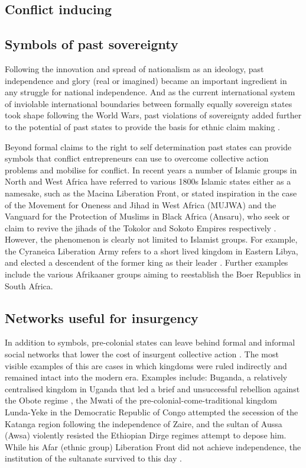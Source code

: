 \documentclass[12pt]{article}
\begin{document}
\subsection{Conflict inducing}

\subsection{Symbols of past sovereignty}

Following the innovation and spread of nationalism as an ideology, past
independence and glory (real or imagined) became an important ingredient in any
struggle for national independence. And as the current international system of
inviolable international boundaries between formally equally sovereign states
took shape following the World Wars, past violations of sovereignty added
further to the potential of past states to provide the basis for ethnic claim
making \citep{Ahram2019, Shelef2016}. 

Beyond formal claims to the right to self determination past states can provide
symbols that conflict entrepreneurs can use to overcome collective action
problems and mobilise for conflict. In recent years a number of Islamic groups
in North and West Africa have referred to various 1800s Islamic states either as
a namesake, such as the Macina Liberation Front, or stated inspiration in the
case of the Movement for Oneness and Jihad in West Africa (MUJWA) and the
Vanguard for the Protection of Muslims in Black Africa (Ansaru), who seek or
claim to revive the jihads of the Tokolor and Sokoto Empires respectively
\citep{Zenn2015}. However, the phenomenon is clearly not limited to Islamist
groups. For example, the Cyraneica Liberation Army refers to a short lived
kingdom in Eastern Libya, and elected a descendent of the former king as their
leader \citep{Ahram2019}. Further examples include the various Afrikaaner groups
aiming to reestablish the Boer Republics in South Africa.

\subsection{Networks useful for insurgency}

In addition to symbols, pre-colonial states can leave behind formal and informal
social networks that lower the cost of insurgent collective action
\citep{Wig2016, Wood2000}. The most visible examples of this are cases in which
kingdoms were ruled indirectly and remained intact into the modern era. Examples
include: Buganda, a relatively centralised kingdom in Uganda that led a brief
and unsuccessful rebellion against the Obote regime \citep{Tuck2005}, the Mwati
of the pre-colonial-come-traditional kingdom Lunda-Yeke in the Democratic
Republic of Congo attempted the secession of the Katanga region following the
independence of Zaire, and the sultan of Aussa (Awsa) violently resisted the
Ethiopian Dirge regimes attempt to depose him. While his Afar (ethnic group)
Liberation Front did not achieve independence, the institution of the sultanate
survived to this day \citep{Shehim1985, Hanfare2011}.
\end{document}

